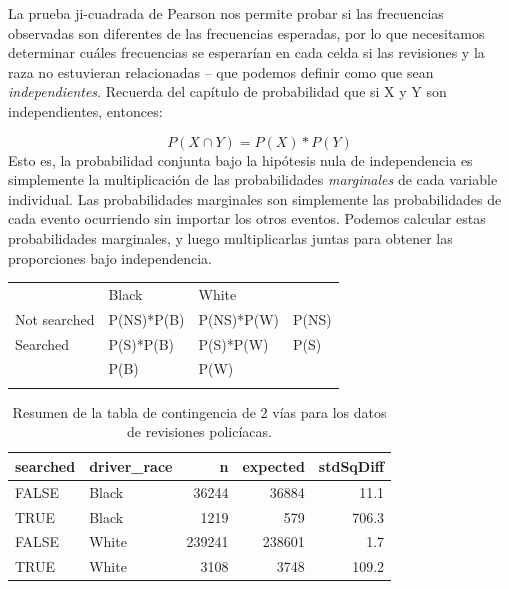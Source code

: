 \documentclass[
  12pt,
]{book}
\theoremstyle{definition}
\theoremstyle{definition}
\theoremstyle{definition}
\theoremstyle{remark}
\begin{document}
La prueba ji-cuadrada de Pearson nos permite probar si las frecuencias observadas son diferentes de las frecuencias esperadas, por lo que necesitamos determinar cuáles frecuencias se esperarían en cada celda si las revisiones y la raza no estuvieran relacionadas -- que podemos definir como que sean \emph{independientes}. Recuerda del capítulo de probabilidad que si X y Y son independientes, entonces:

\[
P(X \cap Y) = P(X) * P(Y)
\]
Esto es, la probabilidad conjunta bajo la hipótesis nula de independencia es simplemente la multiplicación de las probabilidades \emph{marginales} de cada variable individual. Las probabilidades marginales son simplemente las probabilidades de cada evento ocurriendo sin importar los otros eventos. Podemos calcular estas probabilidades marginales, y luego multiplicarlas juntas para obtener las proporciones bajo independencia.

\begin{longtable}[]{@{}llll@{}}
\toprule
& Black & White & \\ \addlinespace
\midrule
\endhead
Not searched & P(NS)*P(B) & P(NS)*P(W) & P(NS) \\ \addlinespace
Searched & P(S)*P(B) & P(S)*P(W) & P(S) \\ \addlinespace
& P(B) & P(W) & \\ \addlinespace
\bottomrule
\end{longtable}

\begin{table}

\caption{\label{tab:unnamed-chunk-80}Resumen de la tabla de contingencia de 2 vías para los datos de revisiones policíacas.}
\centering
\begin{tabular}[t]{l|l|r|r|r}
\hline
searched & driver\_race & n & expected & stdSqDiff\\
\hline
FALSE & Black & 36244 & 36884 & 11.1\\
\hline
TRUE & Black & 1219 & 579 & 706.3\\
\hline
FALSE & White & 239241 & 238601 & 1.7\\
\hline
TRUE & White & 3108 & 3748 & 109.2\\
\hline
\end{tabular}
\end{table}
\end{document}
